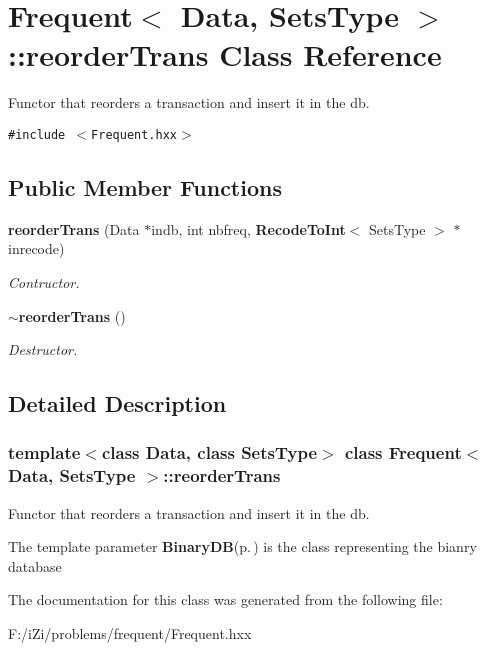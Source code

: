\section{Frequent$<$ Data, Sets\-Type $>$::reorder\-Trans Class Reference}
\label{class_frequent_1_1reorder_trans}
Functor that reorders a transaction and insert it in the db.  


{\tt \#include $<$Frequent.hxx$>$}

\subsection*{Public Member Functions}
\begin{CompactItemize}
\item 
{\bf reorder\-Trans} (Data $\ast$indb, int nbfreq, {\bf Recode\-To\-Int}$<$ Sets\-Type $>$ $\ast$inrecode)\label{class_frequent_1_1reorder_trans_4c3ec352fdc134b0f8abbe059fbd6fef}

\begin{CompactList}\small\item\em Contructor. \item\end{CompactList}\item 
{\bf $\sim$reorder\-Trans} ()\label{class_frequent_1_1reorder_trans_26d0f52720ada6108cc16ddfdb5c3899}

\begin{CompactList}\small\item\em Destructor. \item\end{CompactList}\end{CompactItemize}


\subsection{Detailed Description}
\subsubsection*{template$<$class Data, class Sets\-Type$>$ class Frequent$<$ Data, Sets\-Type $>$::reorder\-Trans}

Functor that reorders a transaction and insert it in the db. 

The template parameter {\bf Binary\-DB}{\rm (p.\,\pageref{class_binary_d_b})} is the class representing the bianry database 



The documentation for this class was generated from the following file:\begin{CompactItemize}
\item 
F:/i\-Zi/problems/frequent/Frequent.hxx\end{CompactItemize}
